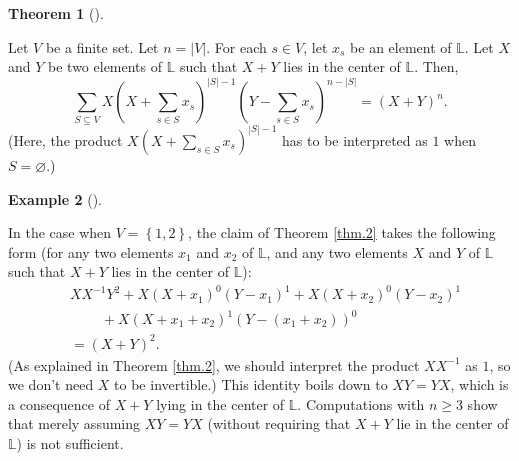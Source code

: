 \documentclass[numbers=enddot,12pt,final,onecolumn,notitlepage]{scrartcl}%
\theoremstyle{definition}
\newtheorem{theo}{Theorem}[section]
\newenvironment{theorem}[1][]
{\begin{theo}[#1]\begin{leftbar}}
{\end{leftbar}\end{theo}}
\newtheorem{exam}[theo]{Example}
\newenvironment{example}[1][]
{\begin{exam}[#1]\begin{leftbar}}
{\end{leftbar}\end{exam}}
\let\sumnonlimits\sum
\renewcommand{\sum}{\sumnonlimits\limits}
\begin{document}
\begin{theorem}
\label{thm.2}Let $V$ be a finite set. Let $n=\left\vert V\right\vert $. For
each $s\in V$, let $x_{s}$ be an element of $\mathbb{L}$. Let $X$ and $Y$ be
two elements of $\mathbb{L}$ such that $X+Y$ lies in the center of
$\mathbb{L}$. Then,%
\[
\sum_{S\subseteq V}X\left(  X+\sum_{s\in S}x_{s}\right)  ^{\left\vert
S\right\vert -1}\left(  Y-\sum_{s\in S}x_{s}\right)  ^{n-\left\vert
S\right\vert }=\left(  X+Y\right)  ^{n}.
\]
(Here, the product $X\left(  X+\sum_{s\in S}x_{s}\right)  ^{\left\vert
S\right\vert -1}$ has to be interpreted as $1$ when $S=\varnothing$.)
\end{theorem}


\begin{example}
In the case when $V=\left\{  1,2\right\}  $, the claim of Theorem \ref{thm.2}
takes the following form (for any two elements $x_{1}$ and $x_{2}$ of
$\mathbb{L}$, and any two elements $X$ and $Y$ of $\mathbb{L}$ such that $X+Y$
lies in the center of $\mathbb{L}$):%
\begin{align*}
&  XX^{-1}Y^{2}+X\left(  X+x_{1}\right)  ^{0}\left(  Y-x_{1}\right)
^{1}+X\left(  X+x_{2}\right)  ^{0}\left(  Y-x_{2}\right)  ^{1}\\
&  \ \ \ \ \ \ \ \ \ \ +X\left(  X+x_{1}+x_{2}\right)  ^{1}\left(  Y-\left(
x_{1}+x_{2}\right)  \right)  ^{0}\\
&  =\left(  X+Y\right)  ^{2}.
\end{align*}
(As explained in Theorem \ref{thm.2}, we should interpret the product
$XX^{-1}$ as $1$, so we don't need $X$ to be invertible.) This identity boils
down to $XY=YX$, which is a consequence of $X+Y$ lying in the center of
$\mathbb{L}$. Computations with $n\geq3$ show that merely assuming $XY=YX$
(without requiring that $X+Y$ lie in the center of $\mathbb{L}$) is not sufficient.
\end{example}
\end{document}
